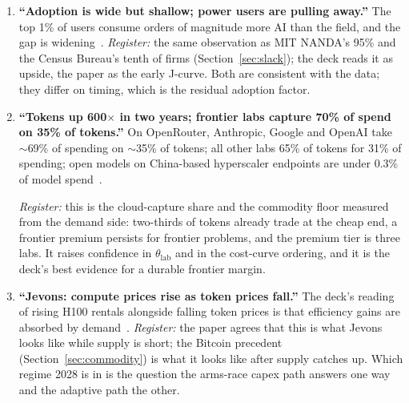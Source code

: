 \documentclass[11pt,letterpaper]{article}
\begin{document}
\begin{enumerate}
\emph{Register:} the last clause is the real disagreement, stated clearly. The paper's feasibility band is an IT-budget band. The deck's position is that AI is paid from labor budgets --- the \$30T global payroll --- not from the \$3.3T software-and-services pool.

Whether labor budgets actually convert to AI spend is Section~\ref{sec:slack}'s question, and the paper's answer (about a quarter of nominal savings reach cash, over a J-curve) is why it keeps the IT-budget band. If the deck is right, the band is wrong by a factor of several and the plateau pays easily; if the slack trap is right, the band holds. This is the single most consequential disagreement between the two documents and the register cannot settle it from 2026 data.

\item \textbf{``Adoption is wide but shallow; power users are pulling away.''} The top 1\% of users consume orders of magnitude more AI than the field, and the gap is widening~\cite{ref:a16z_som}. \emph{Register:} the same observation as MIT NANDA's 95\% and the Census Bureau's tenth of firms (Section~\ref{sec:slack}); the deck reads it as upside, the paper as the early J-curve. Both are consistent with the data; they differ on timing, which is the residual adoption factor.

\item \textbf{``Tokens up 600$\times$ in two years; frontier labs capture 70\% of spend on 35\% of tokens.''} On OpenRouter, Anthropic, Google and OpenAI take $\sim$69\% of spending on $\sim$35\% of tokens; all other labs 65\% of tokens for 31\% of spending; open models on China-based hyperscaler endpoints are under 0.3\% of model spend~\cite{ref:a16z_som,ref:openrouter}.

\emph{Register:} this is the cloud-capture share and the commodity floor measured from the demand side: two-thirds of tokens already trade at the cheap end, a frontier premium persists for frontier problems, and the premium tier is three labs. It raises confidence in $\theta_{\text{lab}}$ and in the cost-curve ordering, and it is the deck's best evidence for a durable frontier margin.

\item \textbf{``Jevons: compute prices rise as token prices fall.''} The deck's reading of rising H100 rentals alongside falling token prices is that efficiency gains are absorbed by demand~\cite{ref:a16z_som}. \emph{Register:} the paper agrees that this is what Jevons looks like while supply is short; the Bitcoin precedent (Section~\ref{sec:commodity}) is what it looks like after supply catches up. Which regime 2028 is in is the question the arms-race capex path answers one way and the adaptive path the other.


\end{enumerate}
\end{document}
